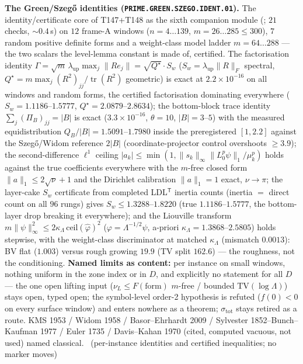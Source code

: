 \documentclass[11pt,a4paper]{article}
\theoremstyle{definition}
\begin{document}
\par\smallskip\noindent\textbf{The Green/Szeg\H{o} identities
(\texttt{PRIME.GREEN.SZEGO.IDENT.01}).}
The identity/certificate core of T147+T148 as the sixth companion module
(; $21$ checks, ${\sim}0.4$\,s) on
$12$ frame-A windows ($n=4\ldots139$, $m=26\ldots285\le300$), $7$ random
positive definite forms and a weight-class model ladder $m=64\ldots288$ ---
the two scalars the level-lemma constant is made of, certified. The
factorisation identity
$\Gamma=\sqrt m\,\lambda_{\mathrm{up}}\max_j\|Re_j\|=\sqrt{Q^\star}\cdot S_w$
($S_w=\lambda_{\mathrm{up}}\|R\|_F$ spectral,
$Q^\star=m\max_j(R^2)_{jj}/\operatorname{tr}(R^2)$ geometric) is exact at
$2.2\times10^{-16}$ on all windows and random forms, the certified
factorisation dominating everywhere ($S_w=1.1186$--$1.5777$,
$Q^\star=2.0879$--$2.8634$); the bottom-block trace identity
$\sum_j(\Pi_B)_{jj}=|B|$ is exact ($3.3\times10^{-16}$, $\theta=10$,
$|B|=3$--$5$) with the measured equidistribution $Q_B/|B|=1.5091$--$1.7980$
inside the preregistered $[1,2.2]$ against the Szeg\H{o}/Widom reference
$2|B|$ (coordinate-projector control overshoots $\ge3.9$); the
second-difference $\ell^1$ ceiling
$|a_k|\le\min(1,\|s_k\|_\infty\|L_0^p\psi\|_1/\mu_k^p)$ holds against the
true coefficients everywhere with the $m$-free closed form
$\|a\|_1\le2\sqrt\nu+1$ and the Dirichlet calibration $\|a\|_1=1$ exact,
$\nu\to\pi$; the layer-cake $S_w$ certificate from completed
LDL$^{\mathsf T}$ inertia counts (inertia $=$ direct count on all $96$
rungs) gives $S_w\le1.3288$--$1.8220$ (true $1.1186$--$1.5777$, the
bottom-layer drop breaking it everywhere); and the Liouville transform
$m\|\psi\|_\infty^2\le2\kappa_\Lambda\,\mathrm{ceil}(\hat\varphi)^2$
($\varphi=\Lambda^{-1/2}\psi$, a-priori
$\kappa_\Lambda=1.3868$--$2.5805$) holds stepwise, with the weight-class
discriminator at matched $\kappa_\Lambda$ (mismatch $0.0013$): BV flat
($1.003$) versus rough growing $19.9$ ($\mathrm{TV}$ split $162.6$) --- the
roughness, not the conditioning.
\textbf{Named limits as content:} per instance on small windows, nothing
uniform in the zone index or in $D$, and explicitly no statement for all $D$
--- the one open lifting input ($\nu_L\le F(\text{form})$ $m$-free /
bounded $\mathrm{TV}(\log\Lambda)$) stays open, typed open; the
symbol-level order-2 hypothesis is refuted ($f(0)<0$ on every surface
window) and enters nowhere as a theorem; $\sigma_{\mathrm{tot}}$ stays
retired as a route. KMS 1953 / Widom 1958 / Basor--Ehrhardt 2009 /
Sylvester 1852--Bunch--Kaufman 1977 / Euler 1735 / Davis--Kahan 1970
(cited, computed vacuous, not used) named classical.
\mE\ (per-instance identities and certified inequalities; no marker moves)
\par\smallskip
\end{document}
